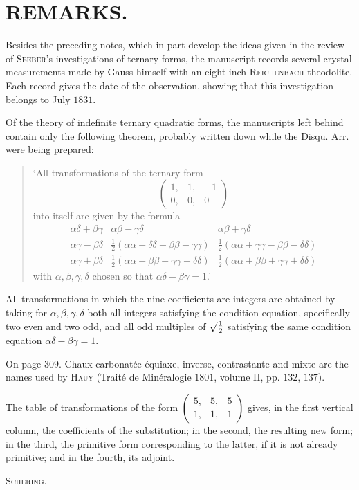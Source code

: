 \clearpage
{}
\section*{REMARKS.}
Besides the preceding notes, which in part develop the ideas given in the review of \textsc{Seeber}'s investigations of ternary forms, the manuscript records several crystal measurements made by Gauss himself with an eight-inch \textsc{Reichenbach} theodolite. Each record gives the date of the observation, showing that this investigation belongs to July $1831$.

Of the theory of indefinite ternary quadratic forms, the manuscripts left behind contain only the following theorem, probably written down while the Disqu. Arr. were being prepared:
\begin{quote}
‘All transformations of the ternary form
\[
\left(\begin{smallmatrix}1,&1,&-1\\0,&0,&0\end{smallmatrix}\right)
\]
into itself are given by the formula
\[
\begin{array}{ccc}
\alpha\delta+\beta\gamma&\alpha\beta-\gamma\delta&\alpha\beta+\gamma\delta\\[.5ex]
\alpha\gamma-\beta\delta&\frac12(\alpha\alpha+\delta\delta-\beta\beta-\gamma\gamma)&\frac12(\alpha\alpha+\gamma\gamma-\beta\beta-\delta\delta)\\[.5ex]
\alpha\gamma+\beta\delta&\frac12(\alpha\alpha+\beta\beta-\gamma\gamma-\delta\delta)&\frac12(\alpha\alpha+\beta\beta+\gamma\gamma+\delta\delta)
\end{array}
\]
with $\alpha,\beta,\gamma,\delta$ chosen so that $\alpha\delta-\beta\gamma=1$.’
\end{quote}

All transformations in which the nine coefficients are integers are obtained by taking for $\alpha,\beta,\gamma,\delta$ both all integers satisfying the condition equation, specifically two even and two odd, and all odd multiples of $\surd\frac12$ satisfying the same condition equation $\alpha\delta-\beta\gamma=1$.

On page $309$. Chaux carbonatée équiaxe, inverse, contrastante and mixte are the names used by \textsc{Hauy} (Traité de Minéralogie $1801$, volume II, pp. $132$, $137$).

The table of transformations of the form $\left(\begin{smallmatrix}5,&5,&5\\1,&1,&1\end{smallmatrix}\right)$ gives, in the first vertical column, the coefficients of the substitution; in the second, the resulting new form; in the third, the primitive form corresponding to the latter, if it is not already primitive; and in the fourth, its adjoint.
\begin{flushright}\textsc{Schering.}\end{flushright}
